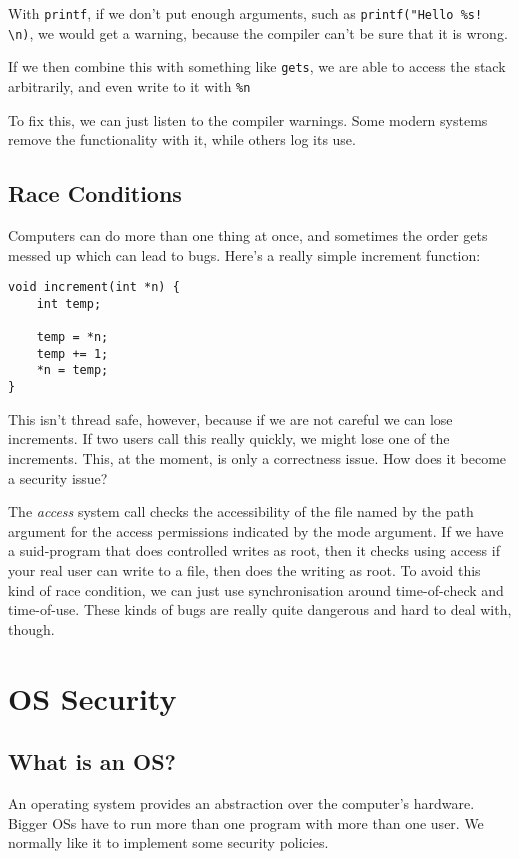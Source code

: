 \documentclass[11pt,a4paper,titlepage,dvipsnames,cmyk]{scrartcl}
\begin{document}
With \texttt{printf}, if we don't put enough arguments, such as \texttt{printf("Hello \%s! \textbackslash n)}, we would get a warning, because the compiler can't be sure that it is wrong.

If we then combine this with something like \texttt{gets}, we are able to access the stack arbitrarily, and even write to it with \texttt{\%n}

To fix this, we can just listen to the compiler warnings. Some modern systems remove the functionality with it, while others log its use.

\subsection{Race Conditions}
Computers can do more than one thing at once, and sometimes the order gets messed up which can lead to bugs. Here's a really simple increment function:
\begin{lstlisting}
void increment(int *n) {
    int temp;

    temp = *n;
    temp += 1;
    *n = temp;
}
\end{lstlisting}

This isn't thread safe, however, because if we are not careful we can lose increments. If two users call this really quickly, we might lose one of the increments. This, at the moment, is only a correctness issue. How does it become a security issue?

The \textit{access} system call checks the accessibility of the file named by the path argument for the access permissions indicated by the mode argument. If we have a suid-program that does controlled writes as root, then it checks using access if your real user can write to a file, then does the writing as root. To avoid this kind of race condition, we can just use synchronisation around time-of-check and time-of-use. These kinds of bugs are really quite dangerous and hard to deal with, though.

\section{OS Security}
\subsection{What is an OS?}
An operating system provides an abstraction over the computer's hardware. Bigger OSs have to run more than one program with more than one user. We normally like it to implement some security policies.
\end{document}
